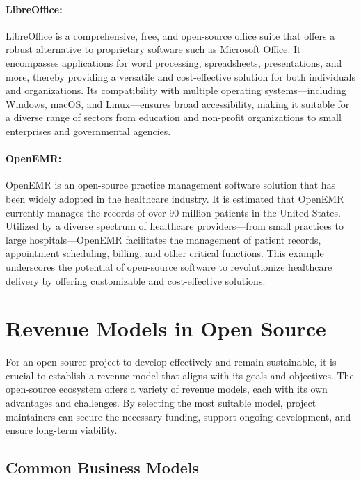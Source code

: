 \paragraph{LibreOffice:}  
LibreOffice is a comprehensive, free, and open-source office suite that offers a robust alternative to proprietary software such as Microsoft Office. It encompasses applications for word processing, spreadsheets, presentations, and more, thereby providing a versatile and cost-effective solution for both individuals and organizations. Its compatibility with multiple operating systems—including Windows, macOS, and Linux—ensures broad accessibility, making it suitable for a diverse range of sectors from education and non-profit organizations to small enterprises and governmental agencies.

\paragraph{OpenEMR:}  
OpenEMR is an open-source practice management software solution that has been widely adopted in the healthcare industry. It is estimated that OpenEMR currently manages the records of over 90 million patients in the United States. Utilized by a diverse spectrum of healthcare providers—from small practices to large hospitals—OpenEMR facilitates the management of patient records, appointment scheduling, billing, and other critical functions. This example underscores the potential of open-source software to revolutionize healthcare delivery by offering customizable and cost-effective solutions.

\cite{Open-Source-EMR-Software}

\section{Revenue Models in Open Source}

For an open-source project to develop effectively and remain sustainable, it is crucial to establish a revenue model that aligns with its goals and objectives. The open-source ecosystem offers a variety of revenue models, each with its own advantages and challenges. By selecting the most suitable model, project maintainers can secure the necessary funding, support ongoing development, and ensure long-term viability.

\subsection{Common Business Models}

